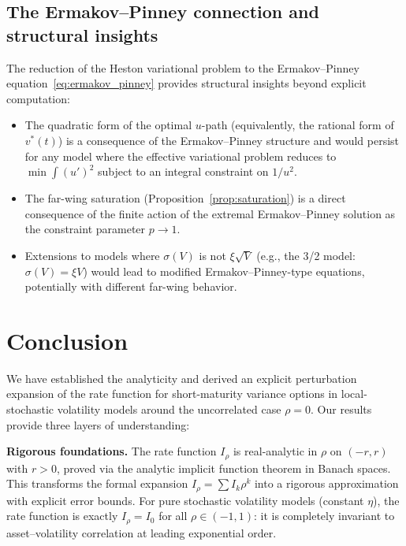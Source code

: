 \documentclass[11pt]{article}
\theoremstyle{definition}
\begin{document}
\subsection{The Ermakov--Pinney connection and structural insights}

The reduction of the Heston variational problem to the Ermakov--Pinney equation~\eqref{eq:ermakov_pinney} provides structural insights beyond explicit computation:
\begin{itemize}
  \item The quadratic form of the optimal $u$-path (equivalently, the rational form of $v^*(t)$) is a consequence of the Ermakov--Pinney structure and would persist for any model where the effective variational problem reduces to $\min \int (u')^2$ subject to an integral constraint on $1/u^2$.
  \item The far-wing saturation (Proposition~\ref{prop:saturation}) is a direct consequence of the finite action of the extremal Ermakov--Pinney solution as the constraint parameter $p \to 1$.
  \item Extensions to models where $\sigma(V)$ is not $\xi\sqrt{V}$ (e.g., the 3/2 model: $\sigma(V) = \xi V$) would lead to modified Ermakov--Pinney-type equations, potentially with different far-wing behavior.
\end{itemize}

\section{Conclusion}\label{sec:conclusion}

We have established the analyticity and derived an explicit perturbation expansion of the rate function for short-maturity variance options in local-stochastic volatility models around the uncorrelated case $\rho = 0$. Our results provide three layers of understanding:

\textbf{Rigorous foundations.} The rate function $I_\rho$ is real-analytic in $\rho$ on $(-r,r)$ with $r > 0$, proved via the analytic implicit function theorem in Banach spaces. This transforms the formal expansion $I_\rho = \sum I_k\rho^k$ into a rigorous approximation with explicit error bounds. For pure stochastic volatility models (constant $\eta$), the rate function is exactly $I_\rho = I_0$ for all $\rho \in (-1,1)$: it is completely invariant to asset--volatility correlation at leading exponential order.
\end{document}

